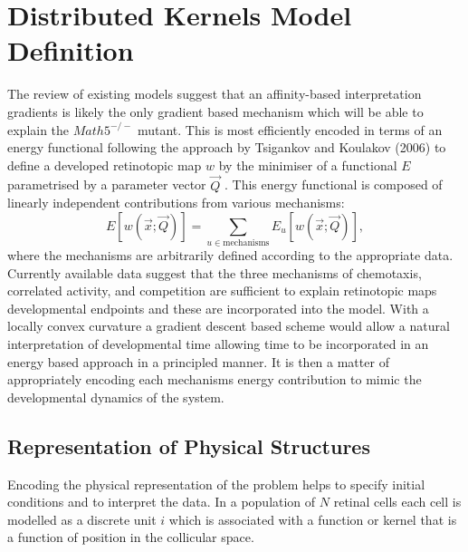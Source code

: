 \section{Distributed Kernels Model Definition}
The review of existing models suggest that an affinity-based interpretation gradients is likely the only gradient based mechanism which will be able to explain the $Math5^{-/-}$ mutant. This is most efficiently encoded in terms of an energy functional following the approach by Tsigankov and Koulakov (2006) to define a developed retinotopic map $w$ by the minimiser of a functional $E$ parametrised by a parameter vector $\vec{Q}$ \cite{Tsigankov2006-uy}. This energy functional is composed of linearly independent contributions from various mechanisms:
\begin{equation}
E[w(\vec{x}; \vec{Q})] = \sum_{u \in \text{mechanisms}} E_u[w(\vec{x}; \vec{Q})],
\end{equation}
where the mechanisms are arbitrarily defined according to the appropriate data. Currently available data suggest that the three mechanisms of chemotaxis, correlated activity, and competition are sufficient to explain retinotopic maps developmental endpoints and these are incorporated into the model. With a locally convex curvature a gradient descent based scheme would allow a natural interpretation of developmental time allowing time to be incorporated in an energy based approach in a principled manner. It is then a matter of appropriately encoding each mechanisms energy contribution to mimic the developmental dynamics of the system.
\subsection{Representation of Physical Structures}
Encoding the physical representation of the problem helps to specify initial conditions and to interpret the data. In a population of $N$ retinal cells each cell is modelled as a discrete unit $i$ which is associated with a function or kernel that is a function of position in the collicular space. 

